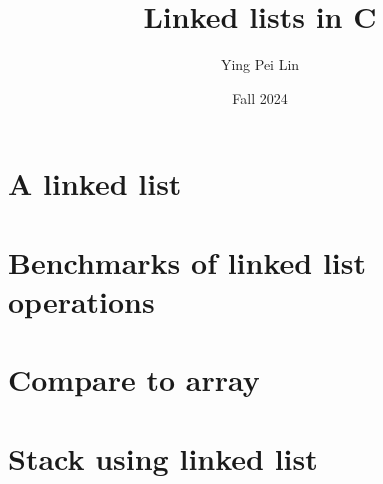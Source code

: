 \documentclass[a4paper,11pt]{article}
\begin{document}
\title{
  \textbf{Linked lists in C}
}
\author{Ying Pei Lin}
\date{Fall 2024}

\maketitle

\section*{A linked list}

\section*{Benchmarks of linked list operations}

\section*{Compare to array}

\section*{Stack using linked list}
\end{document}
